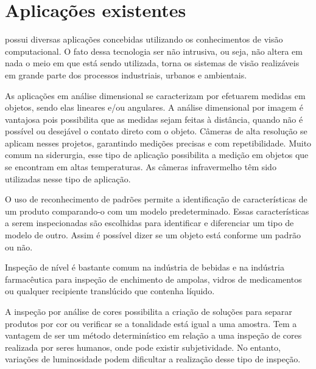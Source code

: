 

\section{Aplicações existentes} %
\label{sec:aplica_es_existentes}

\cite{ivision:2013:online} possui diversas aplicações concebidas utilizando os conhecimentos de visão computacional. O fato dessa tecnologia ser não intrusiva, ou seja, não altera em nada o meio em que está sendo utilizada, torna os sistemas de visão realizáveis em grande parte dos processos industriais, urbanos e ambientais.

As aplicações em análise dimensional se caracterizam por efetuarem medidas em objetos, sendo elas lineares e/ou angulares. A análise dimensional por imagem é vantajosa pois possibilita que as medidas sejam feitas à distância, quando não é possível ou desejável o contato direto com o objeto. Câmeras de alta resolução se aplicam nesses projetos, garantindo medições precisas e com repetibilidade. Muito comum na siderurgia, esse tipo de aplicação possibilita a medição em objetos que se encontram em altas temperaturas. As câmeras infravermelho têm sido utilizadas nesse tipo de aplicação.

O uso de reconhecimento de padrões permite a identificação de características de um produto comparando-o com um modelo predeterminado. Essas características a serem inspecionadas são escolhidas para identificar e diferenciar um tipo de modelo de outro. Assim é possível dizer se um objeto está conforme um padrão ou não.

Inspeção de nível é bastante comum na indústria de bebidas e na indústria farmacêutica para inspeção de enchimento de ampolas, vidros de medicamentos ou qualquer recipiente translúcido que contenha líquido.

A inspeção por análise de cores possibilita a criação de soluções para separar produtos por cor ou verificar se a tonalidade está igual a uma amostra. Tem a vantagem de ser um método determinístico em relação a uma inspeção de cores realizada por seres humanos, onde pode existir subjetividade. No entanto, variações de luminosidade podem dificultar a realização desse tipo de inspeção.

